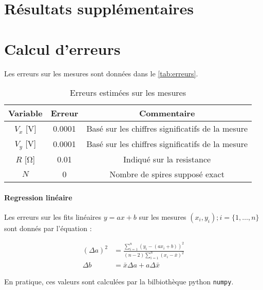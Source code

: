 \section{Résultats supplémentaires}
\label{sec:resultats_bonus}


\section{Calcul d'erreurs}
\label{sec:erreurs}

Les erreurs sur les mesures sont données dans le \autoref{tab:erreurs}.

\begin{table}[h]
    \centering
    \begin{tabulary}{\textwidth}{C C C}
        \toprule
        Variable & Erreur & Commentaire \\
        \midrule
        \(V_x\) [\si{\volt}] & 0.0001 & Basé sur les chiffres significatifs de la mesure \\
        \(V_y\) [\si{\volt}] & 0.0001 & Basé sur les chiffres significatifs de la mesure \\
        \(R\) [\si{\ohm}] & 0.01 & Indiqué sur la resistance \\
        \(N\) & 0 & Nombre de spires supposé exact \\
        \bottomrule
    \end{tabulary}
    \caption{Erreurs estimées sur les mesures}
    \label{tab:erreurs}
\end{table}

\paragraph*{Regression linéaire}
Les erreurs sur les fits linéaires \(y = ax + b\) sur les mesures \((x_i, y_i) ; i = \{1, \hdots, n\}\) sont donnés par l'équation \cite{erreursmesure}:

\begin{equation}
    \label{eq:erreur:fit}
    \begin{aligned}
        (\Delta a)^2 &= \frac{\sum_{i=1}^{n}(y_i - (a x_i + b))^2}{(n-2) \sum_{i=1}^{n}(x_i - \bar{x})^2}\\
        \Delta b &= \bar{x} \Delta a + a \Delta \bar{x}
    \end{aligned}
\end{equation}

En pratique, ces valeurs sont calculées par la bilbiothèque python \texttt{numpy}.

